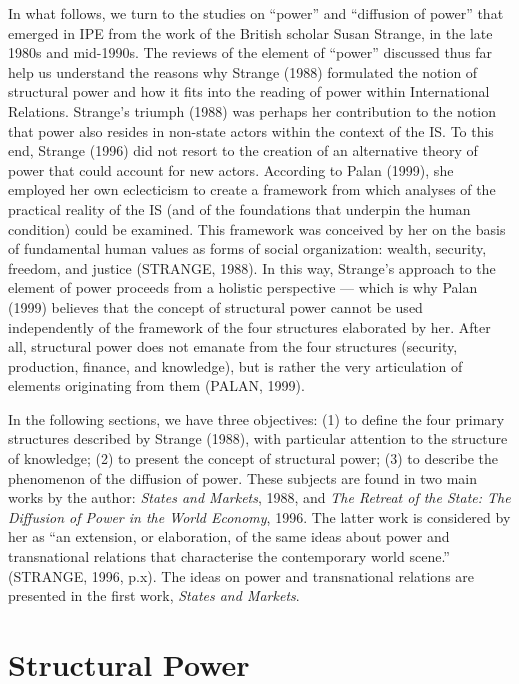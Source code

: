 In what follows, we turn to the studies on ``power'' and ``diffusion of power'' that emerged in IPE from the work of the British scholar Susan Strange, in the late 1980s and mid-1990s. The reviews of the element of ``power'' discussed thus far help us understand the reasons why Strange (1988) formulated the notion of structural power and how it fits into the reading of power within International Relations. Strange's triumph (1988) was perhaps her contribution to the notion that power also resides in non-state actors within the context of the IS. To this end, Strange (1996) did not resort to the creation of an alternative theory of power that could account for new actors. According to Palan (1999), she employed her own eclecticism to create a framework from which analyses of the practical reality of the IS (and of the foundations that underpin the human condition) could be examined. This framework was conceived by her on the basis of fundamental human values as forms of social organization: wealth, security, freedom, and justice (STRANGE, 1988). In this way, Strange's approach to the element of power proceeds from a holistic perspective --- which is why Palan (1999) believes that the concept of structural power cannot be used independently of the framework of the four structures elaborated by her. After all, structural power does not emanate from the four structures (security, production, finance, and knowledge), but is rather the very articulation of elements originating from them (PALAN, 1999).

In the following sections, we have three objectives: (1) to define the four primary structures described by Strange (1988), with particular attention to the structure of knowledge; (2) to present the concept of structural power; (3) to describe the phenomenon of the diffusion of power. These subjects are found in two main works by the author: \textit{States and Markets}, 1988, and \textit{The Retreat of the State: The Diffusion of Power in the World Economy}, 1996. The latter work is considered by her as ``an extension, or elaboration, of the same ideas about power and transnational relations that characterise the contemporary world scene.'' (STRANGE, 1996, p.x). The ideas on power and transnational relations are presented in the first work, \textit{States and Markets}.


\section{Structural Power}

